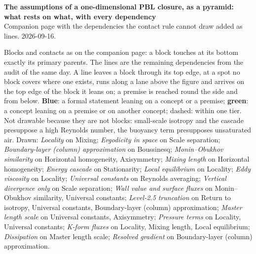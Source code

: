 \documentclass[10pt]{article}
\begin{document}
{\Large\bfseries The assumptions of a one-dimensional PBL closure, as a pyramid: what rests on what, with every dependency}\\[0.3ex]
{\small Companion page with the dependencies the contact rule cannot draw added as lines. 2026-09-16.}

\vspace{0.6ex}
{\footnotesize Blocks and contacts as on the companion page: a block touches at its bottom exactly its primary
parents. The lines are the remaining dependencies from the audit of the same day. A line leaves a block through
its top edge, at a spot no block covers where one exists, runs along a lane above the figure and arrives on the top
edge of the block it leans on; a premise is reached round the side and from below. \textcolor{cLinkF}{\textbf{Blue}}:
a formal statement leaning on a concept or a premise; \textcolor{cLinkC}{\textbf{green}}: a concept leaning on a
premise or on another concept; dashed: within one tier. Not drawable because they are not blocks: small-scale
isotropy and the cascade presuppose a high Reynolds number, the buoyancy term presupposes unsaturated air. Drawn:
\textit{Locality} on Mixing; \textit{Ergodicity in space} on Scale separation; \textit{Boundary-layer (column) approximation} on Boussinesq; \textit{Monin--Obukhov similarity} on Horizontal homogeneity, Axisymmetry; \textit{Mixing length} on Horizontal homogeneity; \textit{Energy cascade} on Stationarity; \textit{Local equilibrium} on Locality; \textit{Eddy viscosity} on Locality; \textit{Universal constants} on Reynolds averaging; \textit{Vertical divergence only} on Scale separation; \textit{Wall value and surface fluxes} on Monin--Obukhov similarity, Universal constants; \textit{Level-2.5 truncation} on Return to isotropy, Universal constants, Boundary-layer (column) approximation; \textit{Master length scale} on Universal constants, Axisymmetry; \textit{Pressure terms} on Locality, Universal constants; \textit{K-form fluxes} on Locality, Mixing length, Local equilibrium; \textit{Dissipation} on Master length scale; \textit{Resolved gradient} on Boundary-layer (column) approximation.\par}
\end{document}
